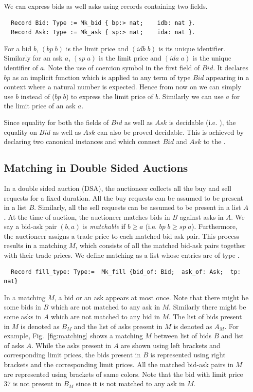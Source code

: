 \documentclass[a4paper,UKenglish,cleveref, autoref]{lipics-v2019}
\begin{document}
We can express bids as well asks using  records containing two fields. 
\begin{verbatim}
  Record Bid: Type := Mk_bid { bp:> nat;    idb: nat }.
  Record Ask: Type := Mk_ask { sp:> nat;    ida: nat }.
\end{verbatim}
For a bid $b$, $(bp \; b)$  is the limit price and $(idb \; b)$ is its unique identifier. Similarly for an ask $a$, $(sp \; a)$ is the limit price and $(ida \; a)$ is the unique identifier of $a$. Note the use of coercion symbol \tw{ :>} in the first field of $Bid$. It declares $bp$ as an implicit function which is applied  to any term of type $Bid$ appearing in a context where a natural number is expected. Hence from now on we can simply use $b$ instead of  ($bp \;b$) to express the limit price of $b$. Similarly we can use $a$ for the limit price of an ask $a$.


Since equality for both the fields of $Bid$ as well as $Ask$ is decidable (i.e. ), the equality on $Bid$ as well as $Ask$ can also be proved decidable. This is achieved by declaring two canonical instances  and  which connect $Bid$ and $Ask$ to the .  

\subsection{Matching in Double Sided Auctions}
In a double sided auction (DSA), the auctioneer collects all the buy and sell requests for a fixed duration. All the buy requests can be assumed to be present in a list $B$. Similarly, all the sell requests can be assumed to be present in a list $A$. At the time of auction, the auctioneer matches bids in $B$ against asks in $A$. We say a bid-ask pair $(b, a)$ is \emph{matchable} if $b \ge a$ (i.e. $bp \; b \ge sp \; a$).  Furthermore, the auctioneer assigns a trade price to each matched bid-ask pair. This  process results in  a matching $M$, which consists of all the matched bid-ask pairs together with their trade prices. We define matching as a list whose entries are of type .
\begin{verbatim}
  Record fill_type: Type:=  Mk_fill {bid_of: Bid;  ask_of: Ask;  tp: nat} 
\end{verbatim}

In a matching $M$, a bid or an ask appears at most once. Note that there might be some bids in $B$ which are not matched to any ask in $M$. Similarly there might be some asks in $A$ which are not matched to any bid in $M$. The list of bids present in $M$ is denoted as $B_{M}$ and the list of asks present in $M$ is denoted as $A_M$. For example, Fig.~\ref{fig:matching} shows a matching $M$ between list of bids $B$ and list of asks $A$.  While the asks present in $A$ are shown using left brackets and corresponding limit prices, the bids present in $B$ is represented using right brackets and the corresponding limit prices.  All the matched bid-ask pairs in $M$ are  represented using  brackets of same colors. Note that the bid with limit price $37$ is not present in $B_M$ since it is not matched to any ask in $M$.  
\end{document}
